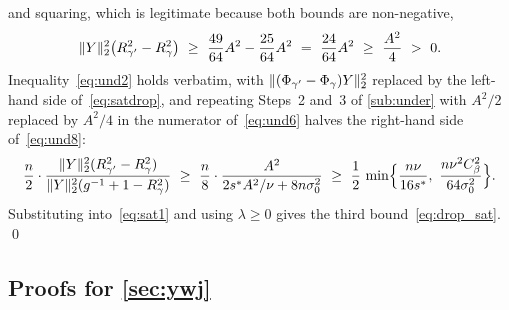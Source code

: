 and squaring, which is legitimate because both bounds are non-negative,
\begin{equation}
    \label{eq:satdrop}
    \lVert Y\rVert_2^{2}\bigl(R^{2}_{\gamma'}-R^{2}_{\gamma}\bigr)
    \ \geq\ \frac{49}{64}A^{2}-\frac{25}{64}A^{2}
    \ =\ \frac{24}{64}A^{2}\ \geq\ \frac{A^{2}}{4}\ >\ 0 .
\end{equation}
Inequality~\eqref{eq:und2} holds verbatim, with
$\lVert(\Phi_{\gamma'}-\Phi_\gamma)Y\rVert_2^{2}$ replaced by the left-hand
side of~\eqref{eq:satdrop}, and repeating Steps~2 and~3 of
\cref{sub:under} with $A^{2}/2$ replaced by $A^{2}/4$ in the numerator
of~\eqref{eq:und6} halves the right-hand side of~\eqref{eq:und8}:
\begin{equation*}
    \frac n2\cdot
    \frac{\lVert Y\rVert_2^{2}(R^{2}_{\gamma'}-R^{2}_{\gamma})}
    {\lVert Y\rVert_2^{2}(g^{-1}+1-R^{2}_{\gamma})}
    \ \geq\ \frac n8\cdot\frac{A^{2}}
    {2s^{\ast}A^{2}/\nu+8n\sigma_0^{2}}
    \ \geq\ \frac12\,\min\Bigl\{\frac{n\nu}{16s^{\ast}},\ \frac{n\nu^{2}C_\beta^{2}}{64\sigma_0^{2}}\Bigr\} .
\end{equation*}
Substituting into~\eqref{eq:sat1} and using $\lambda\geq0$ gives the third
bound~\eqref{eq:drop_sat}. \qed

\subsection{Proofs for \cref{sec:ywj}}
\label{sub:appywj}

